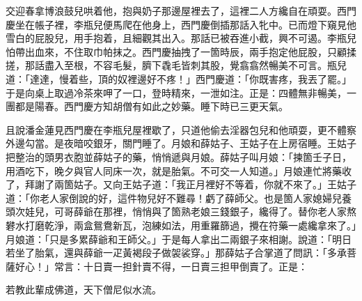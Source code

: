 交迎春拿博浪鼓兒哄着他，抱與奶子那邊屋裡去了，這裡二人方纔自在頑耍。西門慶坐在帳子裡，李瓶兒便馬爬在他身上，西門慶倒插那話入牝中。已而燈下窺見他雪白的屁股兒，用手抱着，且細觀其出入。那話已被吞進小截，興不可遏。李瓶兒怕帶出血來，{}不住取巾帕抹之。西門慶抽拽了一箇時辰，兩手抱定他屁股，只顧揉搓，那話盡入至根，不容毛髮，臍下毳毛皆刺其股，覺翕翕然暢美不可言。瓶兒道：「達達，慢着些，頂的奴裡邊好不疼！」西門慶道：「你既害疼，我丟了罷。」于是向桌上取過冷茶來呷了一口，登時精來，一泄如注。正是：四體無非暢美，一團都是陽春。西門慶方知胡僧有如此之妙藥。睡下時已三更天氣。

且說潘金蓮見西門慶在李瓶兒屋裡歇了，只道他偷去淫器包兒和他頑耍，更不體察外邊勾當。是夜暗咬銀牙，關門睡了。月娘和薛姑子、王姑子在上房宿睡。王姑子把整治的頭男衣胞並薛姑子的藥，悄悄遞與月娘。薛姑子叫月娘：「揀箇壬子日，用酒吃下，晚夕與官人同床一次，就是胎氣。不可交一人知道。」月娘連忙將藥收了，拜謝了兩箇姑子。又向王姑子道：「我正月裡好不等着，你就不來了。」王姑子道：「你老人家倒說的好，這件物兒好不難尋！虧了薛師父。也是箇人家媳婦兒養頭次娃兒，可哥薛爺在那裡，悄悄與了箇熟老娘三錢銀子，纔得了。{}替你老人家熬礬水打磨乾淨，兩盒鴛鴦新瓦，泡練如法，用重羅篩過，攪在符藥一處纔拿來了。」月娘道：「只是多累薛爺和王師父。」于是每人拿出二兩銀子來相謝。說道：「明日若坐了胎氣，還與薛爺一疋黃褐段子做袈裟穿。」那薛姑子合掌道了問訊：「多承菩薩好心！」常言：十日賣一担針賣不得，一日賣三担甲倒賣了。正是：

\begin{myquote} 
若教此輩成佛道，天下僧尼似水流。
\end{myquote} 

